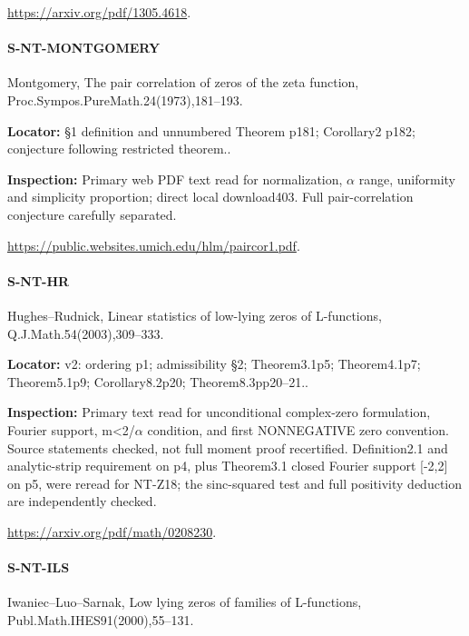 \documentclass[11pt,a4paper]{article}
\begin{document}
\url{https://arxiv.org/pdf/1305.4618}.

\paragraph{S-NT-MONTGOMERY} Montgomery, The pair correlation of zeros of the zeta function, Proc.\allowbreak{}Sympos.\allowbreak{}PureMath.\allowbreak{}24(1973),181–\allowbreak{}193.

\textbf{Locator:} §1 definition and unnumbered Theorem p181; Corollary2 p182; conjecture following restricted theorem.\allowbreak{}.

\textbf{Inspection:} Primary web PDF text read for normalization, \ensuremath{\alpha} range, uniformity and simplicity proportion; direct local download403.\allowbreak{} Full pair-correlation conjecture carefully separated.\allowbreak{}

\url{https://public.websites.umich.edu/hlm/paircor1.pdf}.

\paragraph{S-NT-HR} Hughes–\allowbreak{}Rudnick, Linear statistics of low-lying zeros of L-functions, Q.\allowbreak{}J.\allowbreak{}Math.\allowbreak{}54(2003),309–\allowbreak{}333.

\textbf{Locator:} v2:\allowbreak{} ordering p1; admissibility §2; Theorem3.\allowbreak{}1p5; Theorem4.\allowbreak{}1p7; Theorem5.\allowbreak{}1p9; Corollary8.\allowbreak{}2p20; Theorem8.\allowbreak{}3pp20–\allowbreak{}21.\allowbreak{}.

\textbf{Inspection:} Primary text read for unconditional complex-zero formulation, Fourier support, m<2/\allowbreak{}\ensuremath{\alpha} condition, and first NONNEGATIVE zero convention.\allowbreak{} Source statements checked, not full moment proof recertified.\allowbreak{} Definition2.\allowbreak{}1 and analytic-strip requirement on p4, plus Theorem3.\allowbreak{}1 closed Fourier support [-2,2] on p5, were reread for NT-Z18; the sinc-squared test and full positivity deduction are independently checked.\allowbreak{}

\url{https://arxiv.org/pdf/math/0208230}.

\paragraph{S-NT-ILS} Iwaniec–\allowbreak{}Luo–\allowbreak{}Sarnak, Low lying zeros of families of L-functions, Publ.\allowbreak{}Math.\allowbreak{}IHES91(2000),55–\allowbreak{}131.
\end{document}
